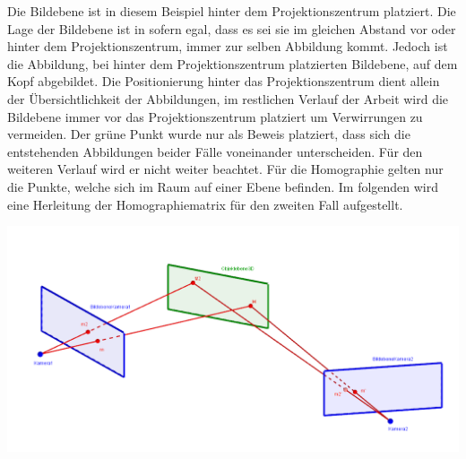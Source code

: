 Die Bildebene ist in diesem Beispiel hinter dem Projektionszentrum platziert. Die Lage der Bildebene ist in sofern egal, dass es sei sie im gleichen Abstand vor oder hinter dem Projektionszentrum, immer zur selben Abbildung kommt. Jedoch ist die Abbildung, bei hinter dem Projektionszentrum platzierten Bildebene, auf dem Kopf abgebildet. Die Positionierung hinter das Projektionszentrum dient allein der Übersichtlichkeit der Abbildungen, im restlichen Verlauf der Arbeit wird die Bildebene immer vor das Projektionszentrum platziert um Verwirrungen zu vermeiden. Der grüne Punkt wurde nur als Beweis platziert, dass sich die entstehenden Abbildungen beider Fälle voneinander unterscheiden. Für den weiteren Verlauf wird er nicht weiter beachtet. Für die Homographie gelten nur die Punkte, welche sich im Raum auf einer Ebene befinden. Im folgenden wird eine Herleitung der Homographiematrix für den zweiten Fall aufgestellt. 

\begin{minipage}{\linewidth}
	\centering
	\includegraphics[width=1.\linewidth]{images/HomographieGrafik.png}
\end{minipage}\\

